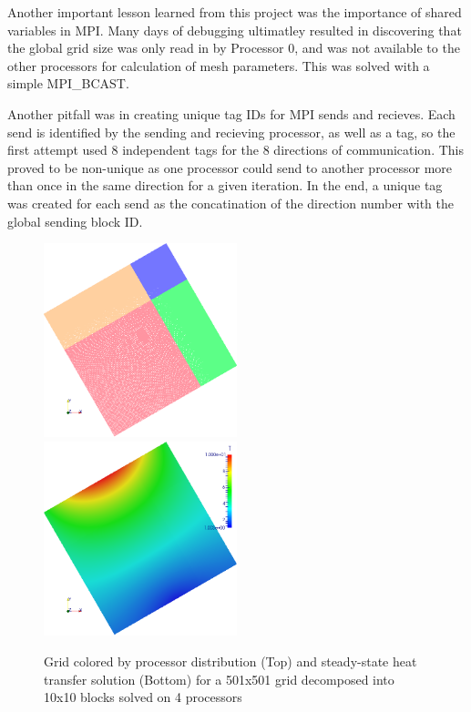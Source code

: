 \documentclass[twocolumn,10pt]{asme2ej}
\begin{document}
Another important lesson learned from this project was the importance of shared variables in MPI.  Many days of debugging ultimatley resulted in discovering that the global grid size was only read in by Processor 0, and was not available to the other processors for calculation of mesh parameters.  This was solved with a simple MPI\_BCAST.

Another pitfall was in creating unique tag IDs for MPI sends and recieves.  Each send is identified by the sending and recieving processor, as well as a tag, so the first attempt used 8 independent tags for the 8 directions of communication.  This proved to be non-unique as one processor could send to another processor more than once in the same direction for a given iteration.  In the end, a unique tag was created for each send as the concatination of the direction number with the global sending block ID.

\begin{figure}[htb]
\begin{center}
\includegraphics[width=0.5\textwidth]{../Results/np4_nx501_n10_m10/Grid.png}
\includegraphics[width=0.5\textwidth]{../Results/np4_nx501_n10_m10/Composite.png}
\caption{Grid colored by processor distribution (Top) and steady-state heat transfer solution (Bottom) for a 501x501 grid decomposed into 10x10 blocks solved on 4 processors}
\label{Temp}
\end{center}
\end{figure}
\end{document}
